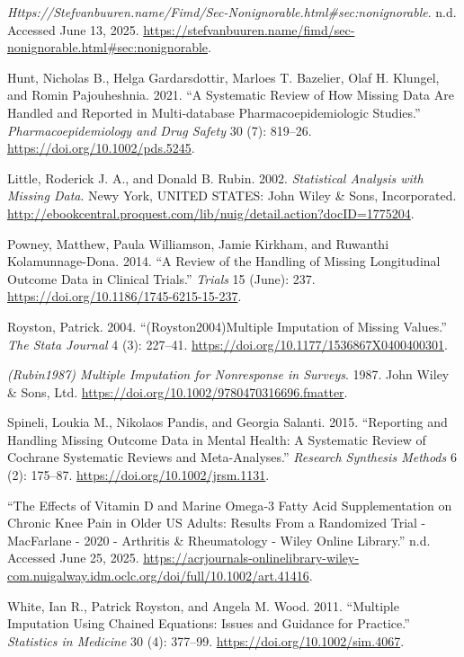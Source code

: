 \documentclass{article}
\newlength{\cslhangindent}
\newenvironment{CSLReferences}[2] %
 {\begin{list}{}{%
  \setlength{\itemindent}{0pt}
  \setlength{\leftmargin}{0pt}
  \setlength{\parsep}{0pt}
  \ifodd #1
   \setlength{\leftmargin}{\cslhangindent}
   \setlength{\itemindent}{-1\cslhangindent}
  \fi
  \setlength{\itemsep}{#2\baselineskip}}}
 {\end{list}}
\begin{document}
\begin{CSLReferences}{1}{0}
\emph{Https://Stefvanbuuren.name/Fimd/Sec-Nonignorable.html\#sec:nonignorable}.
n.d. Accessed June 13, 2025.
\url{https://stefvanbuuren.name/fimd/sec-nonignorable.html\#sec:nonignorable}.

Hunt, Nicholas B., Helga Gardarsdottir, Marloes T. Bazelier, Olaf H.
Klungel, and Romin Pajouheshnia. 2021. {``A Systematic Review of How
Missing Data Are Handled and Reported in Multi‐database
Pharmacoepidemiologic Studies.''} \emph{Pharmacoepidemiology and Drug
Safety} 30 (7): 819--26. \url{https://doi.org/10.1002/pds.5245}.

Little, Roderick J. A., and Donald B. Rubin. 2002. \emph{Statistical
{Analysis} with {Missing} {Data}}. Newy York, UNITED STATES: John Wiley
\& Sons, Incorporated.
\url{http://ebookcentral.proquest.com/lib/nuig/detail.action?docID=1775204}.

Powney, Matthew, Paula Williamson, Jamie Kirkham, and Ruwanthi
Kolamunnage-Dona. 2014. {``A Review of the Handling of Missing
Longitudinal Outcome Data in Clinical Trials.''} \emph{Trials} 15
(June): 237. \url{https://doi.org/10.1186/1745-6215-15-237}.

Royston, Patrick. 2004. {``({Royston2004}){Multiple} {Imputation} of
{Missing} {Values}.''} \emph{The Stata Journal} 4 (3): 227--41.
\url{https://doi.org/10.1177/1536867X0400400301}.

\emph{({Rubin1987}) {Multiple} {Imputation} for {Nonresponse} in
{Surveys}}. 1987. John Wiley \& Sons, Ltd.
\url{https://doi.org/10.1002/9780470316696.fmatter}.

Spineli, Loukia M., Nikolaos Pandis, and Georgia Salanti. 2015.
{``Reporting and Handling Missing Outcome Data in Mental Health: A
Systematic Review of {Cochrane} Systematic Reviews and Meta-Analyses.''}
\emph{Research Synthesis Methods} 6 (2): 175--87.
\url{https://doi.org/10.1002/jrsm.1131}.

{``The {Effects} of {Vitamin} {D} and {Marine} {Omega}‐3 {Fatty} {Acid}
{Supplementation} on {Chronic} {Knee} {Pain} in {Older} {US} {Adults}:
{Results} {From} a {Randomized} {Trial} - {MacFarlane} - 2020 -
{Arthritis} \& {Rheumatology} - {Wiley} {Online} {Library}.''} n.d.
Accessed June 25, 2025.
\url{https://acrjournals-onlinelibrary-wiley-com.nuigalway.idm.oclc.org/doi/full/10.1002/art.41416}.

White, Ian R., Patrick Royston, and Angela M. Wood. 2011. {``Multiple
Imputation Using Chained Equations: {Issues} and Guidance for
Practice.''} \emph{Statistics in Medicine} 30 (4): 377--99.
\url{https://doi.org/10.1002/sim.4067}.

\end{CSLReferences}



\end{document}
